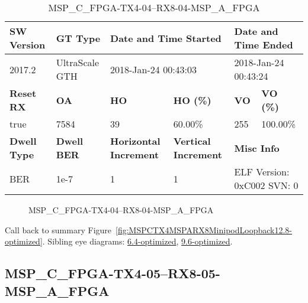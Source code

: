 \begin{table}[h]
\centering
\caption{MSP\_C\_FPGA-TX4-04--RX8-04-MSP\_A\_FPGA}
\label{tab:MSPCFPGATX404RX804MSPAFPGA12.8-optimized}
\begin{tabular}{@{}|l|l|l|l|l|l|@{}}
\toprule
\textbf{SW Version}                & \textbf{GT Type}   & \multicolumn{2}{l|}{\textbf{Date and Time Started}}            & \multicolumn{2}{l|}{\textbf{Date and Time Ended}}        \\ \midrule
2017.2                       & UltraScale GTH          & \multicolumn{2}{l|}{2018-Jan-24 00:43:03}                   & \multicolumn{2}{l|}{2018-Jan-24 00:43:24}               \\ \midrule
\textbf{Reset RX}                  & \textbf{OA} & \textbf{HO}   & \textbf{HO (\%)} & \textbf{VO} & \textbf{VO (\%)} \\ \midrule
true & 7584        & 39          & 60.00\%        & 255        & 100.00\%       \\ \midrule
\textbf{Dwell Type}                & \textbf{Dwell BER} & \textbf{Horizontal Increment} & \textbf{Vertical Increment}    & \multicolumn{2}{l|}{\textbf{Misc Info}}                  \\ \midrule
BER                            & 1e-7        & 1        & 1           & \multicolumn{2}{l|}{ELF Version: 0xC002 SVN: 0}                         \\ \bottomrule
\end{tabular}
\end{table}

\begin{figure}[h]
\caption{MSP\_C\_FPGA-TX4-04--RX8-04-MSP\_A\_FPGA} \label{fig:MSPCFPGATX404RX804MSPAFPGA12.8-optimized}
\end{figure}

Call back to summary Figure~\ref{fig:MSPCTX4MSPARX8MinipodLoopback12.8-optimized}.
Sibling eye diagrams: \hyperref[sec:MSPCFPGATX404RX804MSPAFPGA6.4-optimized]{6.4-optimized}, \hyperref[sec:MSPCFPGATX404RX804MSPAFPGA9.6-optimized]{9.6-optimized}.

\clearpage
\newpage


\subsection{MSP\_C\_FPGA-TX4-05--RX8-05-MSP\_A\_FPGA}\label{sec:MSPCFPGATX405RX805MSPAFPGA12.8-optimized}

